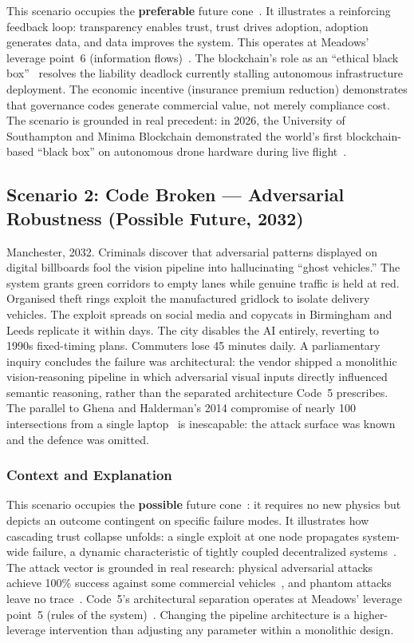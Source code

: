 \documentclass[sigconf,nonacm]{acmart}
\begin{document}
This scenario occupies the \textbf{preferable} future cone~\cite{dunne2013}. It illustrates a reinforcing feedback loop: transparency enables trust, trust drives adoption, adoption generates data, and data improves the system. This operates at Meadows' leverage point~6 (information flows)~\cite{meadows1999}. The blockchain's role as an ``ethical black box''~\cite{winfield2017} resolves the liability deadlock currently stalling autonomous infrastructure deployment. The economic incentive (insurance premium reduction) demonstrates that governance codes generate commercial value, not merely compliance cost. The scenario is grounded in real precedent: in 2026, the University of Southampton and Minima Blockchain demonstrated the world's first blockchain-based ``black box'' on autonomous drone hardware during live flight~\cite{southampton2026}.

\subsection{Scenario 2: Code Broken --- Adversarial Robustness (Possible Future, 2032)}

Manchester, 2032. Criminals discover that adversarial patterns displayed on digital billboards fool the vision pipeline into hallucinating ``ghost vehicles.'' The system grants green corridors to empty lanes while genuine traffic is held at red. Organised theft rings exploit the manufactured gridlock to isolate delivery vehicles. The exploit spreads on social media and copycats in Birmingham and Leeds replicate it within days. The city disables the AI entirely, reverting to 1990s fixed-timing plans. Commuters lose 45 minutes daily. A parliamentary inquiry concludes the failure was architectural: the vendor shipped a monolithic vision-reasoning pipeline in which adversarial visual inputs directly influenced semantic reasoning, rather than the separated architecture Code~5 prescribes. The parallel to Ghena and Halderman's 2014 compromise of nearly 100 intersections from a single laptop~\cite{ghena2014} is inescapable: the attack surface was known and the defence was omitted.

\subsubsection{Context and Explanation}

This scenario occupies the \textbf{possible} future cone~\cite{dunne2013}: it requires no new physics but depicts an outcome contingent on specific failure modes. It illustrates how cascading trust collapse unfolds: a single exploit at one node propagates system-wide failure, a dynamic characteristic of tightly coupled decentralized systems~\cite{witthaut2022}. The attack vector is grounded in real research: physical adversarial attacks achieve 100\% success against some commercial vehicles~\cite{wang2025}, and phantom attacks leave no trace~\cite{nassi2020}. Code~5's architectural separation operates at Meadows' leverage point~5 (rules of the system)~\cite{meadows1999}. Changing the pipeline architecture is a higher-leverage intervention than adjusting any parameter within a monolithic design.
\end{document}
